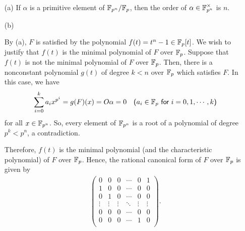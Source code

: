 \begin{sol}
    \begin{enumerate}
        \item[(a)]
        {
            If $\alpha$ is a primitive element of ${\mathbb{F}}_{p^n}/{\mathbb{F}}_p$, then the order of $\alpha\in{\mathbb{F}}_{p^n}^\times$ is $n$.
        }
        \item[(b)]
        {
            By (a), $F$ is satisfied by the polynomial $f(t)=t^n-1\in{\mathbb{F}}_p[t]$.
            We wish to justify that $f(t)$ is the minimal polynomial of $F$ over ${\mathbb{F}}_p$.
            Suppose that $f(t)$ is not the minimal polynomial of $F$ over ${\mathbb{F}}_p$.
            Then, there is a nonconstant polynomial $g(t)$ of degree $k<n$ over ${\mathbb{F}}_p$ which satisfies $F$.
            In this case, we have
            \begin{align*}
                \sum_{i=0}^k a_ix^{p^i}=g(F)(x)=O\alpha=0\quad\textsf{($a_i\in{\mathbb{F}}_p$ for $i=0, 1, \cdots, k$)}
            \end{align*}
            for all $x\in{\mathbb{F}}_{p^n}$.
            So, every element of ${\mathbb{F}}_{p^n}$ is a root of a polynomial of degree $p^k<p^n$, a contradiction.

            Therefore, $f(t)$ is the minimal polynomial (and the characteristic polynomial) of $F$ over ${\mathbb{F}}_p$.
            Hence, the rational canonical form of $F$ over ${\mathbb{F}}_p$ is given by
            \begin{align*}
                \left(\begin{array}{ccccc|c}
                        0   &   0   &   0   &   \cdots  &   0   &   1   \\\hline
                        1   &   0   &   0   &   \cdots  &   0   &   0   \\
                        0   &   1   &   0   &   \cdots  &   0   &   0   \\
                    \vdots  &\vdots &\vdots &   \ddots  &\vdots & \vdots\\
                        0   &   0   &   0   &   \cdots  &   0   &   0   \\
                        0   &   0   &   0   &   \cdots  &   1   &   0   \\
                \end{array}\right).
            \end{align*}

}
\end{enumerate}
\end{sol}
